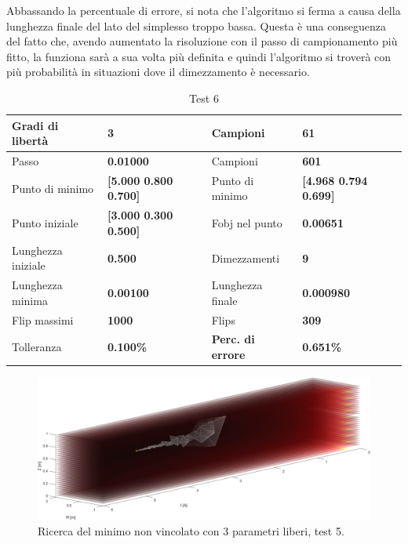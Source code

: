 \documentclass[a4paper, 11pt]{article}
\begin{document}
\noindent
Abbassando la percentuale di errore, si nota che l'algoritmo si ferma a causa
della lunghezza finale del lato del simplesso troppo bassa. Questa è una
conseguenza del fatto che, avendo aumentato la risoluzione con il passo di
campionamento più fitto, la funziona sarà a sua volta più definita e quindi
l'algoritmo si troverà con più probabilità in situazioni dove il dimezzamento è necessario.

\begin{table}[h] 
	\caption{Test 6}
	\begin{center}
	\begin{tabular}{|l|l|l|l|} 
	\hline 
	Gradi di libertà & \textbf{3} & Campioni & \textbf{61} \\ \hline 
	Passo & \textbf{0.01000} & Campioni & \textbf{601} \\ \hline 
	Punto di minimo & \textbf{{[}5.000 0.800 0.700{]}} & Punto di minimo & \textbf{{[}4.968 0.794 0.699{]}} \\ \hline 
	Punto iniziale & \textbf{{[}3.000 0.300 0.500{]}} & Fobj nel punto & \textbf{0.00651} \\ \hline 
	Lunghezza iniziale & \textbf{0.500} & Dimezzamenti & \textbf{9} \\ \hline 
	Lunghezza minima & \textbf{0.00100} & Lunghezza finale & \textbf{0.000980} \\ \hline
	Flip massimi & \textbf{1000} & Flips & \textbf{309} \\ \hline 
	Tolleranza & \textbf{0.100\%} & \textbf{Perc. di errore} & \textbf{0.651\%} \\ \hline 
	\end{tabular}
	\end{center}
	\end{table}

\begin{figure}[H]
	\centering
		\includegraphics[width=16cm]{assets/figure4}
		\caption{Ricerca del minimo non vincolato con 3 parametri liberi, test 5.}
\end{figure}
\noindent 
\end{document}
